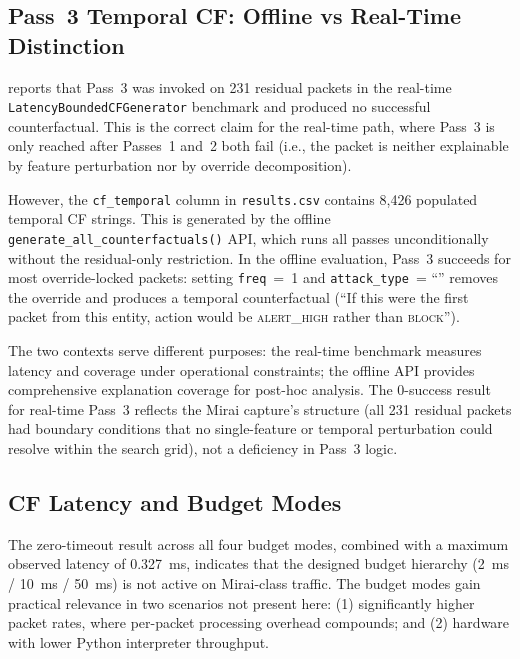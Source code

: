\documentclass[preprint,12pt,authoryear]{elsarticle}
\begin{document}
\subsection{Pass~3 Temporal CF: Offline vs Real-Time Distinction}
\label{sec:disc_pass3}

 reports that Pass~3 was invoked on 231 residual packets in
the real-time \texttt{LatencyBoundedCFGenerator} benchmark and produced no
successful counterfactual. This is the correct claim for the real-time path, where
Pass~3 is only reached after Passes~1 and~2 both fail (i.e., the packet is neither
explainable by feature perturbation nor by override decomposition).

However, the \texttt{cf\_temporal} column in \texttt{results.csv} contains
8{,}426 populated temporal CF strings. This is generated by the offline
\texttt{generate\_all\_counterfactuals()} API, which runs all passes
unconditionally without the residual-only restriction. In the offline
evaluation, Pass~3 succeeds for most override-locked packets: setting
\texttt{freq}~=~1 and \texttt{attack\_type}~= ``'' removes the override and
produces a temporal counterfactual (``If this were the first packet from this
entity, action would be \textsc{alert\_high} rather than \textsc{block}'').

The two contexts serve different purposes: the real-time benchmark measures
latency and coverage under operational constraints; the offline API provides
comprehensive explanation coverage for post-hoc analysis. The 0-success result
for real-time Pass~3 reflects the Mirai capture's structure (all 231 residual
packets had boundary conditions that no single-feature or temporal perturbation
could resolve within the search grid), not a deficiency in Pass~3 logic.

\subsection{CF Latency and Budget Modes}
\label{sec:disc_latency}

The zero-timeout result across all four budget modes, combined with a maximum
observed latency of \SI{0.327}{\ms}, indicates that the designed budget hierarchy
(2~ms / 10~ms / 50~ms) is not active on Mirai-class traffic. The budget modes
gain practical relevance in two scenarios not present here: (1) significantly
higher packet rates, where per-packet processing overhead compounds; and (2)
hardware with lower Python interpreter throughput.
\end{document}
